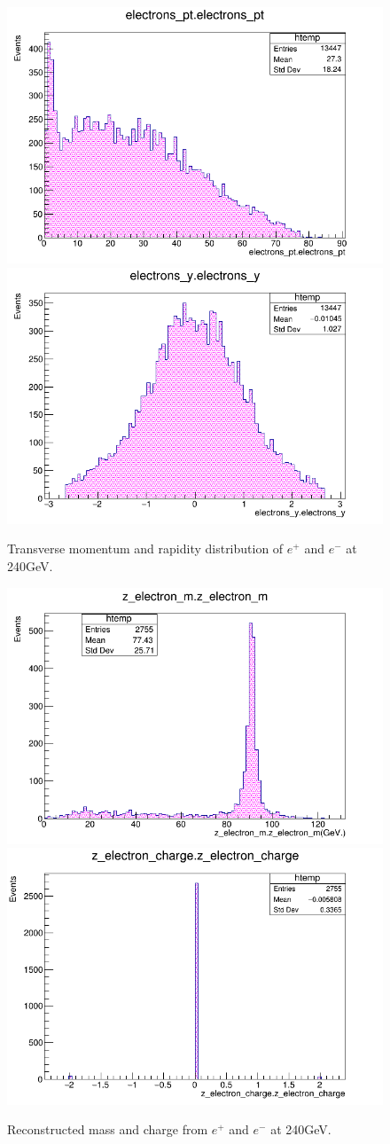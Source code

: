 \begin{figure}[ht!]
    \centering
    \includegraphics[width=0.5\linewidth]{plots/plots/ept.png}\hfill
    \includegraphics[width=0.5\linewidth]{plots/plots/ey.png}
    \caption{Transverse momentum and rapidity distribution of $e^{+}$ and $e^{-}$ at 240GeV.}                      
\end{figure}


\begin{figure}[ht!]
    \centering
    \includegraphics[width=0.5\linewidth]{plots/plots/z_e_m.png}\hfill
    \includegraphics[width=0.5\linewidth]{plots/plots/z_e_charge.png}
    \caption{Reconstructed mass and charge  from  $e^{+}$ and $e^{-}$ at 240GeV.}
    \label{fig:z_e_m}
\end{figure}    
\clearpage

